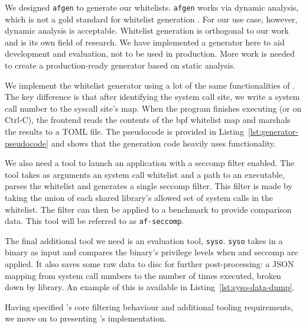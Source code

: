 We designed \texttt{afgen} to generate our whitelists. \texttt{afgen} works via dynamic analysis,
which is not a gold standard for whitelist generation \cite{OPTIMUS}. For our
use case, however, dynamic analysis is acceptable. Whitelist generation is orthogonal to our
work and is its own field of research. We have implemented a generator here
to aid development and evaluation, not to be used in production. More work is needed to create a
production-ready generator based on static analysis.

We implement the whitelist generator using a lot of the same functionalities of
\af. The key difference is that after identifying the system call site, we write a
system call number to the syscall site's map. When the program finishes executing
(or on Ctrl-C), the frontend reads the
contents of the \ac{bpf} whitelist map and marshals the results to a TOML file.
The pseudocode is provided in Listing~\ref{lst:generator-pseudocode} and shows
that the generation code heavily uses \afg functionality.

We also need a tool to launch an application with a seccomp filter enabled.
The tool takes as arguments an \af system call whitelist
and a path to an executable, parses the whitelist and generates a single
seccomp filter. This filter is made by taking the union of each shared 
library's allowed set of system calls in the \af whitelist. The filter can
then be applied to a benchmark to provide comparison data. This tool will be
referred to as \texttt{af-seccomp}.

The final additional tool we need is an evaluation tool, \texttt{syso}.
\texttt{syso} takes in a binary as input and compares the 
binary's privilege levels when \af and seccomp are applied. It also saves
some raw data to disc for further post-processing: a JSON mapping from
system call numbers to the number of times executed, broken down by library. An
example of this is available in Listing~\ref{lst:syso-data-dump}.

Having specified \af's core filtering behaviour and additional tooling
requirements, we move on to presenting \af's implementation.
